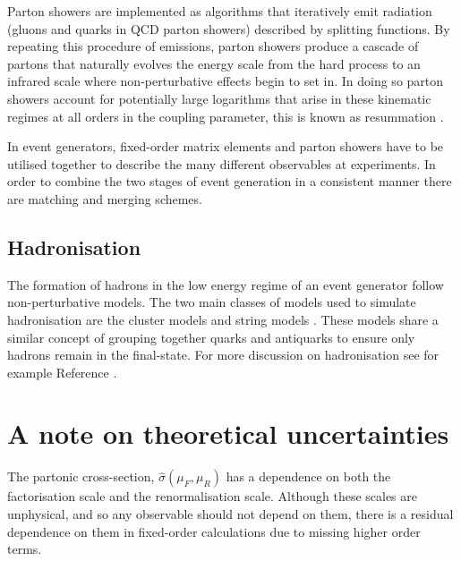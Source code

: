 \documentclass[main.tex]{subfiles}
\begin{document}
    Parton showers are implemented as algorithms that
    iteratively emit radiation (gluons and quarks in QCD
    parton showers) described by splitting functions.
    By repeating this procedure of emissions, parton
    showers produce a cascade of partons that naturally
    evolves the energy scale from the hard process to
    an infrared scale where non-perturbative effects
    begin to set in. In doing so parton showers account
    for potentially large logarithms that arise in
    these kinematic regimes at all orders in the coupling
    parameter, this is known as resummation \cite{Buckley:2011ms}.

    In event generators, fixed-order matrix elements
    and parton showers have to be utilised together to describe
    the many different observables at experiments. In order
    to combine the two stages of event generation in a consistent
    manner there are matching \cite{Frixione:2002ik,Frixione:2007vw,Jadach:2015mza}
    and merging \cite{Catani:2001cc,Lonnblad:2011xx}
    schemes.

    \subsection*{Hadronisation}\label{sec:hadronisation}
    The formation of hadrons in the low energy regime
    of an event generator follow non-perturbative models.
    The two main classes of models used to simulate
    hadronisation are the cluster models \cite{Webber:1983if,Winter:2003tt}
    and string models \cite{Andersson:1983ia}.
    These models share a similar concept of grouping together
    quarks and antiquarks to ensure only hadrons remain
    in the final-state. For more discussion on hadronisation
    see for example Reference \cite{Webber:1999ui}.

    \section{A note on theoretical uncertainties}\label{sec:scale_variations}
    The partonic cross-section, $\hat{\sigma}(\mu_{F}, \mu_{R})$ has
    a dependence on both the factorisation scale and the
    renormalisation scale. Although these scales are unphysical,
    and so any observable should not depend on them,
    there is a residual dependence on them in fixed-order
    calculations due to missing higher order terms.
\end{document}
